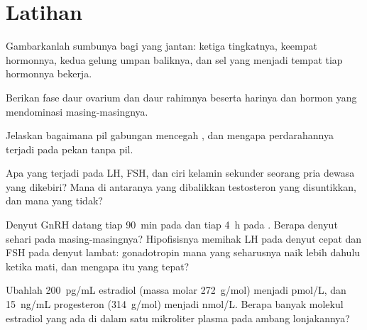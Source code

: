\section{Latihan}

\begin{exercise}[$\star$]\label{exo:b2:reproductive-hormones:1}
Gambarkanlah sumbunya bagi yang jantan: ketiga tingkatnya, keempat
hormonnya, kedua gelung umpan baliknya, dan sel yang menjadi tempat
tiap hormonnya bekerja.
\end{exercise}

\begin{exercise}[$\star$]\label{exo:b2:reproductive-hormones:2}
Berikan fase daur ovarium dan daur rahimnya beserta harinya dan hormon
yang mendominasi masing-masingnya.
\end{exercise}

\begin{exercise}[$\star$]\label{exo:b2:reproductive-hormones:3}
Jelaskan bagaimana pil gabungan mencegah , dan mengapa
perdarahannya terjadi pada pekan tanpa pil.
\end{exercise}

\begin{exercise}[$\star$]\label{exo:b2:reproductive-hormones:4}
Apa yang terjadi pada LH, FSH, dan ciri kelamin sekunder seorang pria
dewasa yang dikebiri? Mana di antaranya yang dibalikkan testosteron
yang disuntikkan, dan mana yang tidak?
\end{exercise}

\begin{exercise}[$\star\star$]\label{exo:b2:reproductive-hormones:5}
Denyut GnRH datang tiap \qty{90}{min} pada  dan
tiap \qty{4}{h} pada . Berapa denyut sehari pada
masing-masingnya? Hipofisisnya memihak LH pada denyut cepat dan FSH
pada denyut lambat: gonadotropin mana yang seharusnya naik lebih dahulu
ketika  mati, dan mengapa itu yang tepat?
\end{exercise}

\begin{exercise}[$\star\star$]\label{exo:b2:reproductive-hormones:6}
Ubahlah \qty{200}{pg/mL} estradiol (massa molar
\qty{272}{g/mol}) menjadi \unit{pmol/L}, dan \qty{15}{ng/mL}
progesteron (\qty{314}{g/mol}) menjadi \unit{nmol/L}. Berapa banyak
molekul estradiol yang ada di dalam satu mikroliter plasma pada ambang
lonjakannya?
\end{exercise}

